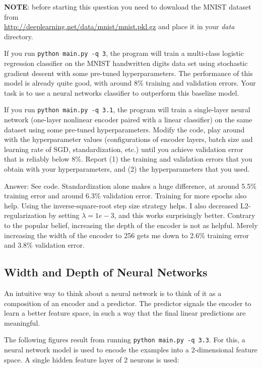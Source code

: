 \documentclass{article}
\def\ans#1{\par\gre{Answer: #1}}
\def\blu#1{{\color{blu}#1}}
\def\gre#1{{\color{gre}#1}}
\begin{document}
\textbf{NOTE}: before starting this question you need to download the MNIST dataset from \\ \url{http://deeplearning.net/data/mnist/mnist.pkl.gz} and place it in your \emph{data} directory.

If you run \texttt{python main.py -q 3}, the program will train a multi-class logistic regression classifier on the MNIST handwritten digits data set using stochastic gradient descent with some pre-tuned hyperparameters. The performance of this model is already quite good, with around 8\% training and validation errors. Your task is to use a neural networks classifier to outperform this baseline model.

If you run \texttt{python main.py -q 3.1}, the program will train a single-layer neural network (one-layer nonlinear encoder paired with a linear classifier) on the same dataset using some pre-tuned hyperparameters. Modify the code, play around with the hyperparameter values (configurations of encoder layers, batch size and learning rate of SGD, standardization, etc.) until you achieve validation error that is reliably below 8\%.
\blu{Report (1) the training and validation errors that you obtain with your hyperparameters, and (2) the hyperparameters that you used.}

\ans{See code. Standardization alone makes a huge difference, at around 5.5\% training error and around 6.3\% validation error. Training for more epochs also help. Using the inverse-square-root step size strategy helps. I also decreased L2-regularization by setting $\lambda=1e-3$, and this works surprisingly better. Contrary to the popular belief, increasing the depth of the encoder is not as helpful. Merely increasing the width of the encoder to 256 gets me down to 2.6\% training error and 3.8\% validation error.}

\subsection{Width and Depth of Neural Networks}

An intuitive way to think about a neural network is to think of it as a composition of an encoder and a predictor. The predictor signals the encoder to learn a better feature space, in such a way that the final linear predictions are meaningful.

The following figures result from running \texttt{python main.py -q 3.3}. For this, a neural network model is used to encode the examples into a 2-dimensional feature space. A single hidden feature layer of 2 neurons is used:
\end{document}
